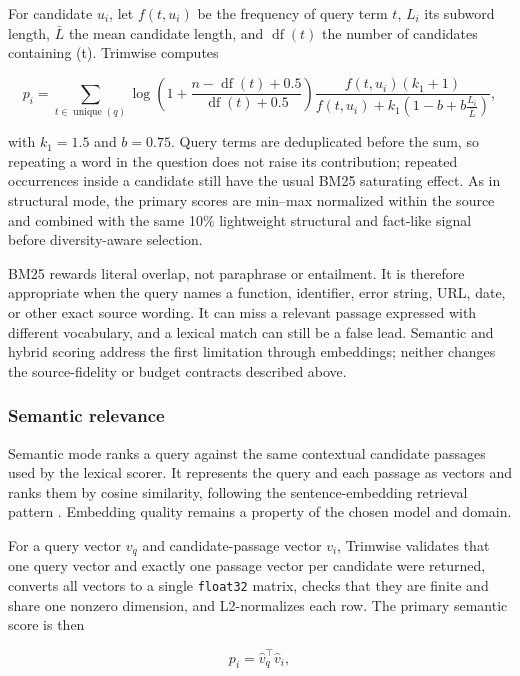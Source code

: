 \documentclass[
]{article}
\begin{document}
For candidate \(u_i\), let \(f(t,u_i)\) be the frequency of query term
\(t\), \(L_i\) its subword length, \(\bar L\) the mean candidate length,
and \(\operatorname{df}(t)\) the number of candidates containing (t).
Trimwise computes

\[
p_i = \sum_{t \in \operatorname{unique}(q)}
\log\!\left(1 + \frac{n-\operatorname{df}(t)+0.5}
{\operatorname{df}(t)+0.5}\right)
\frac{f(t,u_i)(k_1+1)}
{f(t,u_i)+k_1\left(1-b+b\frac{L_i}{\bar L}\right)},
\]

with \(k_1=1.5\) and \(b=0.75\). Query terms are deduplicated before the
sum, so repeating a word in the question does not raise its
contribution; repeated occurrences inside a candidate still have the
usual BM25 saturating effect. As in structural mode, the primary scores
are min--max normalized within the source and combined with the same
10\% lightweight structural and fact-like signal before diversity-aware
selection.

BM25 rewards literal overlap, not paraphrase or entailment. It is
therefore appropriate when the query names a function, identifier, error
string, URL, date, or other exact source wording. It can miss a relevant
passage expressed with different vocabulary, and a lexical match can
still be a false lead. Semantic and hybrid scoring address the first
limitation through embeddings; neither changes the source-fidelity or
budget contracts described above.

\subsubsection{Semantic relevance}\label{semantic-relevance}

Semantic mode ranks a query against the same contextual candidate
passages used by the lexical scorer. It represents the query and each
passage as vectors and ranks them by cosine similarity, following the
sentence-embedding retrieval pattern
\citep{reimers-gurevych-2019-sentence}. Embedding quality remains a
property of the chosen model and domain.

For a query vector \(v_q\) and candidate-passage vector \(v_i\),
Trimwise validates that one query vector and exactly one passage vector
per candidate were returned, converts all vectors to a single
\texttt{float32} matrix, checks that they are finite and share one
nonzero dimension, and L2-normalizes each row. The primary semantic
score is then

\[
p_i = \hat{v}_q^\top \hat{v}_i,
\]
\end{document}
